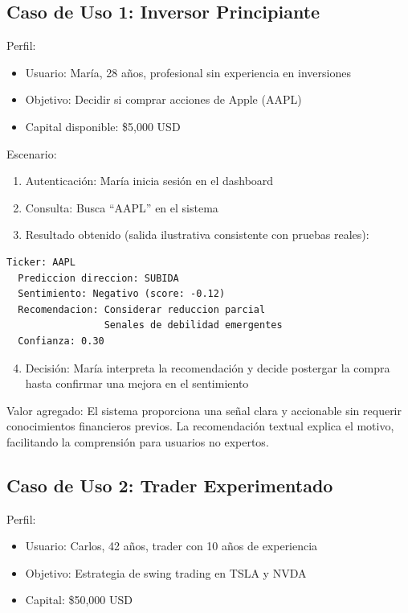   \subsection{Caso de Uso 1: Inversor Principiante}

  Perfil:
  \begin{itemize}
      \item Usuario: María, 28 años, profesional sin experiencia en inversiones
      \item Objetivo: Decidir si comprar acciones de Apple (AAPL)
      \item Capital disponible: \$5,000 USD
  \end{itemize}

  Escenario:
  \begin{enumerate}
      \item Autenticación: María inicia sesión en el dashboard
      \item Consulta: Busca ``AAPL'' en el sistema
      \item Resultado obtenido (salida ilustrativa consistente con pruebas reales):
  \end{enumerate}

  \begin{lstlisting}[language={}]
  Ticker: AAPL
  Prediccion direccion: SUBIDA
  Sentimiento: Negativo (score: -0.12)
  Recomendacion: Considerar reduccion parcial
                 Senales de debilidad emergentes
  Confianza: 0.30  \end{lstlisting}

  \begin{enumerate}
      \setcounter{enumi}{3}
      \item Decisión: María interpreta la recomendación y decide postergar la compra hasta    
  confirmar una mejora en el sentimiento
  \end{enumerate}

  Valor agregado: El sistema proporciona una señal clara y accionable sin requerir   
  conocimientos financieros previos. La recomendación textual explica el motivo, facilitando  
  la comprensión para usuarios no expertos.

  \subsection{Caso de Uso 2: Trader Experimentado}

  Perfil:
  \begin{itemize}
      \item Usuario: Carlos, 42 años, trader con 10 años de experiencia
      \item Objetivo: Estrategia de swing trading en TSLA y NVDA
      \item Capital: \$50,000 USD
  \end{itemize}

